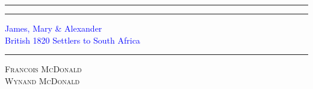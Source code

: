 \newcommand{\plogo}{\fbox{$\mathcal{PL}$}} %

\begin{titlingpage}

    \centering %


    \rule{\textwidth}{1pt} %

    \vspace{2pt}\vspace{-\baselineskip} %

    \rule{\textwidth}{0.4pt} %

    \vspace{0.1\textheight} %


    \textcolor{Blue}{
    {\Huge James, Mary \& Alexander}\\[0.5\baselineskip]
    {\Large British 1820 Settlers to South Africa}
    }

    \vspace{0.025\textheight} %

    \rule{0.3\textwidth}{0.4pt} %

    \vspace{0.1\textheight} %


    {\Large \textsc{Francois McDonald\\}} %
    {\Large \textsc{Wynand McDonald}} %

    \vfill %


    {\large\textcolor{Blue}{\plogo}}\\[0.5\baselineskip] %


\end{titlingpage}
